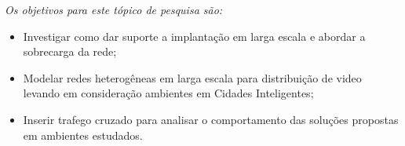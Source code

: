 \emph{Os objetivos para este tópico de pesquisa são: }  

\begin{itemize}
    \item Investigar como dar suporte a implantação em larga escala e abordar a sobrecarga da rede;
    
    \item Modelar redes heterogêneas em larga escala para distribuição de video levando em consideração ambientes em Cidades Inteligentes;
    
    \item Inserir trafego cruzado para analisar o comportamento das soluções propostas em ambientes 
    estudados.
\end{itemize}




